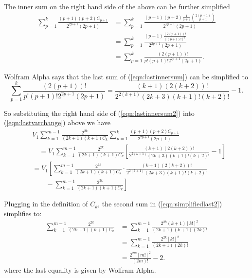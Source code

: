 \documentclass[11pt]{article}
\theoremstyle{definition}
\theoremstyle{definition}
\theoremstyle{plain}
\theoremstyle{plain}
\theoremstyle{plain}
\theoremstyle{definition}
\theoremstyle{definition}
\begin{document}
{The inner sum on the right hand side of the above can be further simplified
\begin{equation}\label{eqn:lastinnersum}
\begin{aligned}
\sum\limits_{p=1}^k\frac{(p+1)(p+2)C_{p+1}}{2^{2p+1}(2p+1)} &= \sum\limits_{p=1}^k\frac{(p+1)(p+2)\frac{1}{p+2}\binom{2(p+1)}{p+1}}{2^{2p+1}(2p+1)} \\
&= \sum\limits_{p=1}^k\frac{(p+1)\frac{(2(p+1))!}{[(p+1)!]^2}}{2^{2p+1}(2p+1)} \\
&= \sum\limits_{p=1}^k\frac{(2(p+1))!}{p!(p+1)!2^{2p+1}(2p+1)}.
\end{aligned}
\end{equation}

Wolfram Alpha says that the last sum of (\ref{eqn:lastinnersum}) can be simplified to
\begin{equation}\label{eqn:lastinnersum2}
\sum\limits_{p=1}^k\frac{(2(p+1))!}{p!(p+1)!2^{2p+1}(2p+1)} = \frac{(k+1)(2(k+2))!}{2^{2(k+1)}(2k+3)(k+1)!(k+2)!}-1.
\end{equation}

So substituting the right hand side of (\ref{eqn:lastinnersum2}) into (\ref{eqn:lastvarchange}) above we have
\begin{equation}\label{eqn:simplifiedlast2}
\begin{aligned}
&V_1\sum\limits_{k=1}^{m-1}\frac{2^{2k}}{(2k+1)(k+1)C_k}\sum\limits_{p=1}^k\frac{(p+1)(p+2)C_{p+1}}{2^{2p+1}(2p+1)} \\
&\quad=V_1\sum\limits_{k=1}^{m-1}\frac{2^{2k}}{(2k+1)(k+1)C_k}\left[\frac{(k+1)(2(k+2))!}{2^{2(k+1)}(2k+3)(k+1)!(k+2)!}-1\right] \\
&= V_1\left[\sum\limits_{k=1}^{m-1}\frac{2^{2k}}{(2k+1)(k+1)C_k}\cdot\frac{(k+1)(2(k+2))!}{2^{2(k+1)}(2k+3)(k+1)!(k+2)!}\right. \\
&\qquad - \left.\sum\limits_{k=1}^{m-1}\frac{2^{2k}}{(2k+1)(k+1)C_k}\right]
\end{aligned}
\end{equation}

Plugging in the definition of $C_k$, the second sum in (\ref{eqn:simplifiedlast2}) simplifies to:
\begin{equation}\label{eqn:lastsecond}
\begin{aligned}
\sum\limits_{k=1}^{m-1}\frac{2^{2k}}{(2k+1)(k+1)C_k} &= \sum\limits_{k=1}^{m-1}\frac{2^{2k}(k+1)[k!]^2}{(2k+1)(k+1)(2k)!} \\
&= \sum\limits_{k=1}^{m-1}\frac{2^{2k}[k!]^2}{(2k+1)(2k)!} \\
&= \frac{2^{2m}[m!]^2}{(2m)!}-2.
\end{aligned}
\end{equation}
where the last equality is given by Wolfram Alpha.

}
\end{document}
